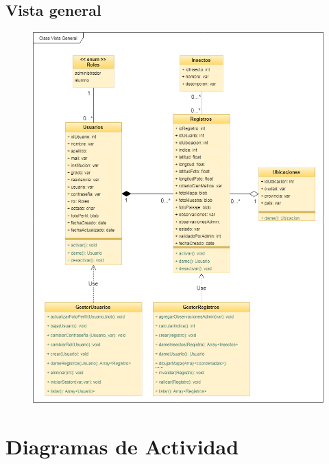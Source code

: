 		\subsection{Vista general}
			\begin{figure}[H]
				\centering
					\includegraphics[width=1\textwidth]{imagenes/DiagramasUML/clase.png}
					\label{fig:diagrama-clases-disenio}
			\end{figure}
	\section{Diagramas de Actividad}
